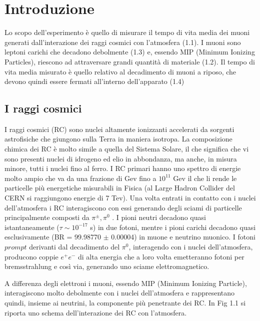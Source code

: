 \documentclass{standalone}
\begin{document}
	\pagestyle{fancy}
	\lhead{\rightmark}
	\rhead{\thepage}

\chapter{Introduzione}
Lo scopo dell'esperimento \`e quello di misurare il tempo di vita media dei muoni generati dall'interazione dei raggi cosmici con l'atmosfera (1.1). I muoni sono leptoni carichi che decadono debolmente (1.3) e, essendo MIP (Minimum Ionizing Particles), riescono ad attraversare grandi quantit\`a di materiale (1.2). Il tempo di vita media misurato \`e quello relativo al decadimento di muoni a riposo, che devono quindi essere fermati all'interno dell'apparato (1.4)

\section{I raggi cosmici}
I raggi cosmici (RC) sono nuclei altamente ionizzanti accelerati da sorgenti astrofisiche che giungono sulla Terra in maniera isotropa. La composizione chimica dei RC \`e molto simile a quella del Sistema Solare, il che significa che vi sono presenti nuclei di idrogeno ed elio in abbondanza, ma anche, in misura minore,  tutti i nuclei fino al ferro.
I RC primari hanno uno spettro di energie molto ampio che va da una frazione di Gev fino a $10^{11}$ Gev il che li rende le particelle pi\`u energetiche misurabili in Fisica (al Large Hadron Collider del CERN si raggiungono energie di 7 Tev).
Una volta entrati in contatto con i nuclei dell'atmosfera i RC interagiscono con essi generando degli sciami di particelle principalmente composti da $\pi^\pm, \pi^0$ \cite{Spurio}.
I pioni neutri decadono quasi istantaneamente ($\tau \sim 10^{-17}$ s) in due fotoni, mentre i pioni carichi decadono quasi esclusivamente (BR = 99.98770 $\pm$ 0.00004) in muone e neutrino muonico.
I fotoni $prompt$ derivanti dal decadimento del $\pi^0$, interagendo con i nuclei dell'atmosfera, producono coppie $e^+e^-$ di alta energia che a loro volta emetteranno fotoni per bremsstrahlung e così via, generando uno sciame elettromagnetico.

A differenza degli elettroni i muoni, essendo MIP (Minimum Ionizing Particle), interagiscono molto debolmente con i nuclei dell'atmosfera e rappresentano quindi, insieme ai neutrini, la componente pi\`u penetrante dei RC. In Fig 1.1 si riporta uno schema dell'interazione dei RC con l'atmosfera. 
\end{document}
